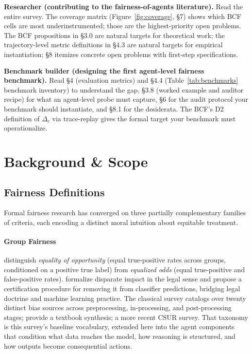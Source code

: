 \documentclass[acmsmall,nonacm]{acmart}
\begin{document}
\textbf{Researcher (contributing to the fairness-of-agents literature).} Read the entire survey. The coverage matrix (Figure~\ref{fig:coverage}, \S{}7) shows which BCF cells are most underinstrumented; those are the highest-priority open problems. The BCF propositions in \S{}3.0 are natural targets for theoretical work; the trajectory-level metric definitions in \S{}4.3 are natural targets for empirical instantiation; \S{}8 itemizes concrete open problems with first-step specifications.

\textbf{Benchmark builder (designing the first agent-level fairness benchmark).} Read \S{}4 (evaluation metrics) and \S{}4.4 (Table~\ref{tab:benchmarks} benchmark inventory) to understand the gap, \S{}3.8 (worked example and auditor recipe) for what an agent-level probe must capture, \S{}6 for the audit protocol your benchmark should instantiate, and \S{}8.1 for the desiderata. The BCF's D2 definition of $\Delta_c$ via trace-replay gives the formal target your benchmark must operationalize.



\section{Background \& Scope}

\subsection{Fairness Definitions}

Formal fairness research has converged on three partially complementary families of criteria, each encoding a distinct moral intuition about equitable treatment.

\paragraph{Group Fairness}

\cite{hardt2016equality} distinguish \emph{equality of opportunity} (equal true-positive rates across groups, conditioned on a positive true label) from \emph{equalized odds} (equal true-positive and false-positive rates). \cite{feldman2015certifying} formalize disparate impact in the legal sense and propose a certification procedure for removing it from classifier predictions, bridging legal doctrine and machine learning practice. The classical survey \cite{mehrabi2021survey} catalogs over twenty distinct bias sources across preprocessing, in-processing, and post-processing stages; \cite{barocas2023fairness} provide a textbook synthesis; \cite{caton2024fairness} a more recent CSUR survey. That taxonomy is this survey's baseline vocabulary, extended here into the agent components that condition what data reaches the model, how reasoning is structured, and how outputs become consequential actions.
\end{document}
